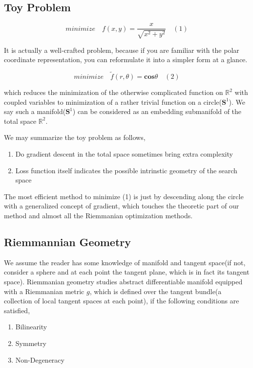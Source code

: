 \documentclass[letterpaper]{article}
\begin{document}
\subsection{Toy Problem}
$$
  minimize \quad f(x,y) = \frac{x}{\sqrt{x^2+y^2}} \quad (1)
$$

It is actually a well-crafted problem, because if you are familiar with the polar coordinate representation, you can reformulate
it into a simpler form at a glance.

$$
  minimize \quad \tilde{f}(r,\theta)=\mathbf{cos}\theta \quad (2)
$$

which reduces the minimization of the otherwise complicated function on $\mathbb{R}^2$ with coupled variables to minimization of a rather trivial
function on a circle($\mathbf{S}^1$). We say such a manifold($\mathbf{S}^1$) can be considered as an embedding submanifold of
the total space $\mathbb{R}^2$.

We may summarize the toy problem as follows,
\begin{enumerate}
  \item Do gradient descent in the total space sometimes bring extra complexity
  \item Loss function itself indicates the possible intrinstic geometry of the search space
\end{enumerate}

The most efficient method to minimize (1) is just by descending along the circle with a generalized concept of gradient, which touches the theoretic part of our method and almost all the Riemmanian
optimization methods.

\subsection{Riemmannian Geometry}
We assume the reader has some knowledge of manifold and tangent space(if not, consider a sphere and at each point the tangent plane, which is in fact its tangent space). Riemmanian geometry studies abstract differentiable manifold equipped with a Riemmanian metric $g$, which is defined over the
tangent bundle(a collection of local tangent spaces at each point), if the following conditions are satisfied,
\begin{enumerate}
  \item Bilinearity
  \item Symmetry
  \item Non-Degeneracy
\end{enumerate}
\end{document}
